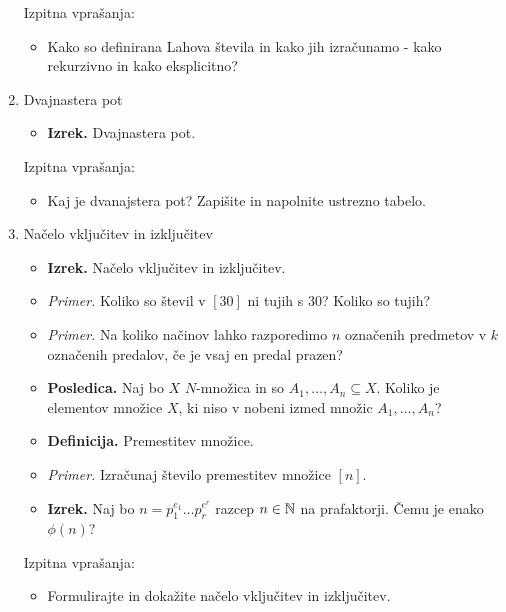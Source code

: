 \begin{enumerate}
    Izpitna vprašanja:
    \begin{itemize}
        \item Kako so definirana Lahova števila in kako jih izračunamo - kako rekurzivno in kako eksplicitno?
    \end{itemize}

    \item Dvajnastera pot
    \begin{itemize}
        \item \colorbox{blue!30}{\textbf{Izrek.}} Dvajnastera pot.
    \end{itemize}

    Izpitna vprašanja:
    \begin{itemize}
        \item Kaj je dvanajstera pot? Zapišite in napolnite ustrezno tabelo.
    \end{itemize}

    \newpage
    \item Načelo vključitev in izključitev
    \begin{itemize}
        \item \colorbox{blue!30}{\textbf{Izrek.}} Načelo vključitev in izključitev.
        \item \colorbox{yellow!30}{\emph{Primer.}} Koliko so števil v \([30]\) ni tujih s \(30\)? Koliko so tujih?
        \item \colorbox{yellow!30}{\emph{Primer.}} Na koliko načinov lahko razporedimo $n$ označenih predmetov v $k$ označenih predalov, če je vsaj en predal prazen?
        \item \colorbox{orange!30}{\textbf{Posledica.}} Naj bo \(X\) \(N\)-množica in so \(A_1, \ldots, A_n \subseteq X\). Koliko je elementov množice \(X\), ki niso v nobeni izmed množic \(A_1, \ldots, A_n\)?
        \item \colorbox{purple!30}{\textbf{Definicija.}} Premestitev množice.
        \item \colorbox{yellow!30}{\emph{Primer.}} Izračunaj število premestitev množice \([n]\).
        \item \colorbox{blue!30}{\textbf{Izrek.}} Naj bo $n = p_1^{e_1} \ldots p_r^{e^r}$ razcep $n \in \mathbb{N}$ na prafaktorji. Čemu je enako \(\phi(n)\)?
    \end{itemize}

    Izpitna vprašanja:
    \begin{itemize}
        \item Formulirajte in dokažite načelo vključitev in izključitev.
    \end{itemize}


\end{enumerate}
